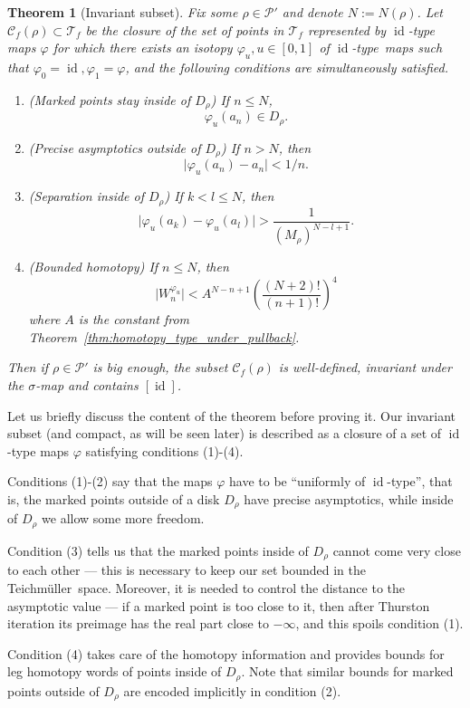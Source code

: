 \documentclass[10pt,reqno,a4paper]{amsart}
\numberwithin{figure}{section}
\numberwithin{equation}{section}
\newtheorem{thm}{Theorem}[section]
\newcommand{\tei}{Teichm\"uller}
\newcommand{\idt}{of $\id$-type}
\newcommand{\id}{\operatorname{id}}
\newcommand{\abs}[1]{\lvert #1 \rvert}
\begin{document}
\begin{thm}[Invariant subset]
	\label{thm:invariant_subset}
	Fix some $\rho\in\mathcal{P}'$ and denote $N:=N(\rho)$. Let $\mathcal{C}_f(\rho)\subset\mathcal{T}_f$ be the \emph{closure} of the set of points in $\mathcal{T}_f$ represented by $\id$-type maps $\varphi$ for which there exists an isotopy $\varphi_u, u\in[0,1]$ \idt\ maps such that $\varphi_0=\id,\varphi_1=\varphi$, and the following conditions are simultaneously satisfied.
	\begin{enumerate}		
		\item (Marked points stay inside of $D_\rho$) If $n\leq N$,
		$$\varphi_u(a_n)\in D_\rho.$$
		\item (Precise asymptotics outside of $D_\rho$) If $n>N$, then
		$$\abs{\varphi_u(a_n)-a_n}<1/n.$$		
		\item (Separation inside of $D_\rho$) If $k<l\leq N$, then $$\abs{\varphi_u(a_k)-\varphi_u(a_l)}>\frac{1}{(M_\rho)^{N-l+1}}.$$
		\item (Bounded homotopy) If $n\leq N$, then 		
		$$\abs{W_n^{\varphi_u}}<A^{N-n+1}\left(\frac{(N+2)!}{(n+1)!}\right)^4$$		
		where $A$ is the constant from Theorem~\ref{thm:homotopy_type_under_pullback}.\\
	\end{enumerate}
	
	Then if $\rho\in\mathcal{P}'$ is big enough, the subset $\mathcal{C}_f(\rho)$ is well-defined, invariant under the $\sigma$-map and contains $[\id]$.	
\end{thm}

Let us briefly discuss the content of the theorem before proving it. Our invariant subset (and compact, as will be seen later) is described as a closure of a set of $\id$-type maps $\varphi$ satisfying conditions (1)-(4).

Conditions (1)-(2) say that the maps $\varphi$ have to be ``uniformly \idt'', that is, the marked points outside of a disk $D_\rho$ have precise asymptotics, while inside of $D_\rho$ we allow some more freedom.

Condition (3) tells us that the marked points inside of $D_\rho$ cannot come very close to each other --- this is necessary to keep our set bounded in the \tei\ space. Moreover, it is needed to control the distance to the asymptotic value --- if a marked point is too close to it, then after Thurston iteration its preimage has the real part close to $-\infty$, and this spoils condition (1).

Condition (4) takes care of the homotopy information and provides bounds for leg homotopy words of points inside of $D_\rho$. Note that similar bounds for marked points outside of $D_\rho$ are encoded implicitly in condition (2).
\end{document}
